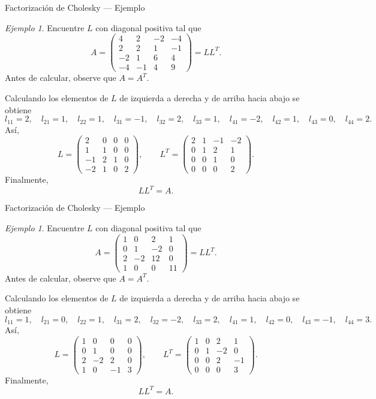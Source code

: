 \documentclass[aspectratio=169,11pt]{beamer}
\theoremstyle{remark}
\newtheorem{Ejem}[definicion]{Ejemplo}
\begin{document}
\begin{frame}[shrink=5]{Factorización de Cholesky — Ejemplo}
\footnotesize
\begin{Ejem}
Encuentre $L$ con diagonal positiva tal que
\[
A=\begin{pmatrix}4 & 2 & -2 & -4\\2 & 2 & 1 & -1\\-2 & 1 & 6 & 4\\-4 & -1 & 4 & 9\end{pmatrix}=LL^T.
\]
Antes de calcular, observe que $A=A^T$.

Calculando los elementos de $L$ de izquierda a derecha y de arriba hacia abajo se obtiene
\[
l_{11}=2,\quad l_{21}=1,\quad l_{22}=1,\quad l_{31}=-1,\quad l_{32}=2,\quad l_{33}=1,\quad l_{41}=-2,\quad l_{42}=1,\quad l_{43}=0,\quad l_{44}=2.
\]
Así,
\[
L=\begin{pmatrix}2 & 0 & 0 & 0\\1 & 1 & 0 & 0\\-1 & 2 & 1 & 0\\-2 & 1 & 0 & 2\end{pmatrix},\qquad L^T=\begin{pmatrix}2 & 1 & -1 & -2\\0 & 1 & 2 & 1\\0 & 0 & 1 & 0\\0 & 0 & 0 & 2\end{pmatrix}.
\]
Finalmente,
\[
\boxed{LL^T=A}.
\]

\end{Ejem}
\end{frame}

\begin{frame}[shrink=5]{Factorización de Cholesky — Ejemplo}
\footnotesize
\begin{Ejem}

Encuentre $L$ con diagonal positiva tal que
\[
A=\begin{pmatrix}1 & 0 & 2 & 1\\0 & 1 & -2 & 0\\2 & -2 & 12 & 0\\1 & 0 & 0 & 11\end{pmatrix}=LL^T.
\]
Antes de calcular, observe que $A=A^T$.


Calculando los elementos de $L$ de izquierda a derecha y de arriba hacia abajo se obtiene
\[
l_{11}=1,\quad l_{21}=0,\quad l_{22}=1,\quad l_{31}=2,\quad l_{32}=-2,\quad l_{33}=2,\quad l_{41}=1,\quad l_{42}=0,\quad l_{43}=-1,\quad l_{44}=3.
\]
Así,
\[
L=\begin{pmatrix}1 & 0 & 0 & 0\\0 & 1 & 0 & 0\\2 & -2 & 2 & 0\\1 & 0 & -1 & 3\end{pmatrix},\qquad L^T=\begin{pmatrix}1 & 0 & 2 & 1\\0 & 1 & -2 & 0\\0 & 0 & 2 & -1\\0 & 0 & 0 & 3\end{pmatrix}.
\]
Finalmente,
\[
\boxed{LL^T=A}.
\]
\end{Ejem}
\end{frame}
\end{document}
